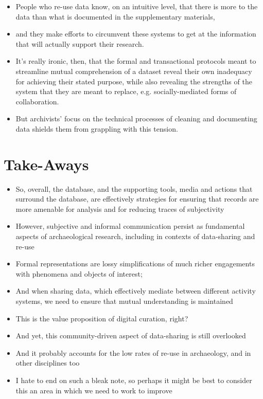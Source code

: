 \documentclass{article}
\begin{document}
\begin{itemize}
  \item People who re-use data know, on an intuitive level, that there is more to the data than what is documented in the supplementary materials,
  \item and they make efforts to circumvent these systems to get at the information that will actually support their research.\\

  \item It's really ironic, then, that the formal and transactional protocols meant to streamline mutual comprehension of a dataset reveal their own inadequacy for achieving their stated purpose, while also revealing the strengths of the system that they are meant to replace, e.g. socially-mediated forms of collaboration.

  \item But archivists' focus on the technical processes of cleaning and documenting data shields them from grappling with this tension.
\end{itemize}

\section{Take-Aways}
\begin{itemize}
  \item So, overall, the database, and the supporting tools, media and actions that surround the database, are effectively strategies for ensuring that records are more amenable for analysis and for reducing traces of subjectivity
  \item However, subjective and informal communication persist as fundamental aspects of archaeological research, including in contexts of data-sharing and re-use\\
  
  \item Formal representations are lossy simplifications of much richer engagements with phenomena and objects of interest;
  \item And when sharing data, which effectively mediate between different activity systems, we need to ensure that mutual understanding is maintained
  \item This is the value proposition of digital curation, right?\\
  
  \item And yet, this community-driven aspect of data-sharing is still overlooked
  \item And it probably accounts for the low rates of re-use in archaeology, and in other disciplines too\\
  
  \item I hate to end on such a bleak note, so perhaps it might be best to consider this an area in which we need to work to improve
  
\end{itemize}
\end{document}
